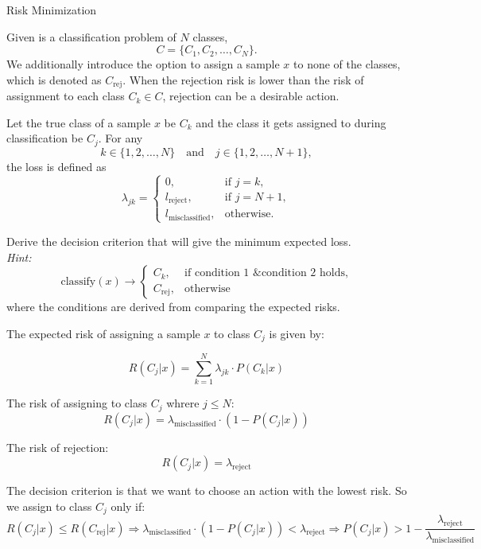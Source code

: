 \documentclass[
	english,
        solution=true
	]{tudaexercise}
\begin{document}
\newpage

\begin{task}[points=11]{Risk Minimization}

Given is a classification problem of $N$ classes,
\[
C = \{C_1, C_2, \dots, C_N\}.
\]
We additionally introduce the option to assign a sample $x$ to none of the classes, which is denoted as $C_{\text{rej}}$. When the rejection risk is lower than the risk of assignment to each class $C_k \in C$, rejection can be a desirable action.

Let the true class of a sample $x$ be $C_k$ and the class it gets assigned to during classification be $C_j$. For any 
\[
k \in \{1,2,\dots,N\} \quad \text{and} \quad j \in \{1,2,\dots,N+1\},
\]
the loss is defined as
\[
\lambda_{jk} =
\begin{cases}
0, & \text{if } j = k, \\
l_{\text{reject}}, & \text{if } j = N+1, \\
l_{\text{misclassified}}, & \text{otherwise.}
\end{cases}
\]

\bigskip

\begin{subtask}[points=3]
 Derive the decision criterion that will give the minimum expected loss. \\
\textit{Hint:} 
\[
\text{classify}(x) \to \begin{cases}
C_k, & \text{if condition 1  \& condition 2 holds}, \\
C_{\text{rej}}, & \text{otherwise}
\end{cases}
\]
where the conditions are derived from comparing the expected risks.

\bigskip

\begin{solution}
The expected risk of assigning a sample $x$ to class $C_j$ is given by:

\[
R(C_j | x) = \sum_{k=1}^{N} \lambda_{jk} \cdot P(C_k | x)
\]


The risk of assigning to class $C_j$ whrere $j \le N$:
\[
R(C_j | x ) = \lambda_{\text{misclassified}} \cdot (1 - P(C_j | x))
\]

The risk of rejection:
\[
R(C_j | x ) = \lambda_{\text{reject}}
\]

The decision criterion is that we want to choose an action with the lowest risk.
So we assign to class $C_j$ only if:
\[
R(C_j | x ) \le R(C_{\text{rej}} | x) \Rightarrow \lambda_{\text{misclassified}} \cdot (1 - P(C_j | x)) < \lambda_{\text{reject}} \Rightarrow P(C_j | x ) > 1 - \frac{\lambda_\text{reject}}{\lambda_\text{misclassified}}
\]


\end{solution}
\end{subtask}
\end{task}
\end{document}
